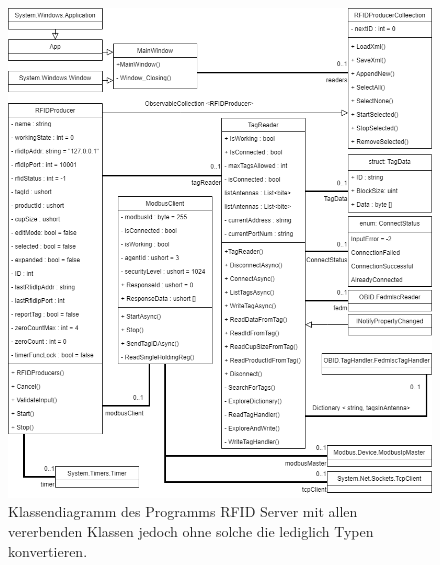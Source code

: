 \begin{figure}
    \caption[Klassendiagramm des Programms RFID Server ]
    {\small Klassendiagramm des Programms RFID Server mit allen vererbenden Klassen jedoch ohne solche die
    lediglich Typen konvertieren.}\label{fig:figure8}
    \includegraphics[width = \textwidth ]{Bilder/RFID_Klassendiagramm}
    \centering
\end{figure}



